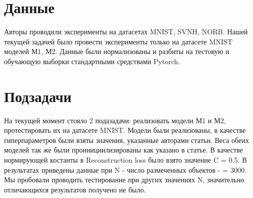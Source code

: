 \documentclass{article}
\begin{document}
\section{Данные}
Авторы проводили эксперименты на датасетах MNIST, SVNH, NORB. 
Нашей текущей задачей было провести эксперименты только на датасете MNIST моделей М1, М2. 
Данные были нормализованы и разбиты на тестовую и обучающую выборки стандартными средствами Pytorch. 

\section{Подзадачи}
На текущей момент стояло 2 подазадачи: реализовать модели М1 и М2, протестировать их на датасете MNIST. Модели были реализованы, в качестве гиперпараметров были взяты значения, указанные авторами статьи. Веса обеих моделей так же были проинициилизированы как указано в статье. В качестве нормирующей костанты в Reconstruction loss было взято значение C = 0.5. В результатах приведены данные при N - число размеченных объектов - = 3000. Мы пробовали проводить тестирование при других значениях N, значительно отличающихся результатов получено не было.
\end{document}
